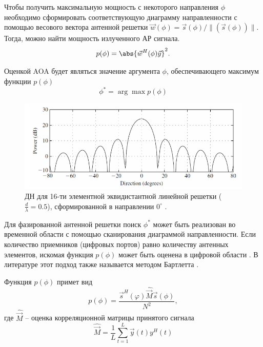 Чтобы получить максимальную мощность с некоторого направления $\phi$ необходимо
сформировать соответствующую диаграмму направленности с помощью
весового вектора антенной решетки $\vec w (\phi) = \vec s(\phi)/\rVert(\vec
    s(\phi))\lVert$.  Тогда, можно найти мощность излученного АР сигнала.
\begin{equation}
    p(\phi) = \abs{\vec w^H (\phi) \vec y}^2.
\end{equation}

Оценкой AOA будет являться значение аргумента $\phi$, обеспечивающего максимум функции $p(\phi)$
\begin{equation}
    \phi^* = \arg\max p(\phi)
\end{equation}

\begin{figure}
    \centering
    \includegraphics[width=\linewidth]{figs/fig3.9}
    \caption{ДН для 16-ти элементной эквидистантной линейной
        решетки ($\frac{d}{\lambda}=0.5$), сформированной в направлении $0^\circ$
        \cite{Tuncer2009}. }
    \label{fig:3.9}
\end{figure}

Для фазированной антенной решетки поиск $\phi^*$ может быть реализован во временной
области с помощью сканирования диаграммой направленности. Если количество
приемников (цифровых портов) равно количеству антенных элементов, искомая
функция $p(\phi)$ может быть оценена в цифровой области \cite{Stoica2005}.  В
литературе этот подход также называется методом Бартлетта \cite{Godara2004}.

Функция $p(\phi)$ примет вид
\begin{equation}
    p(\phi) = \frac{\vec s^H(\varphi) \hat{\vec M} \vec s (\phi)}{N^2},
\end{equation}
где $\hat{\vec M}$ -- оценка корреляционной матрицы принятого сигнала
\begin{equation}
    \hat{\vec M} = \frac{1}{L} \sum\limits_{t=1}^{L} \vec y(t) y^H (t)
\end{equation}

